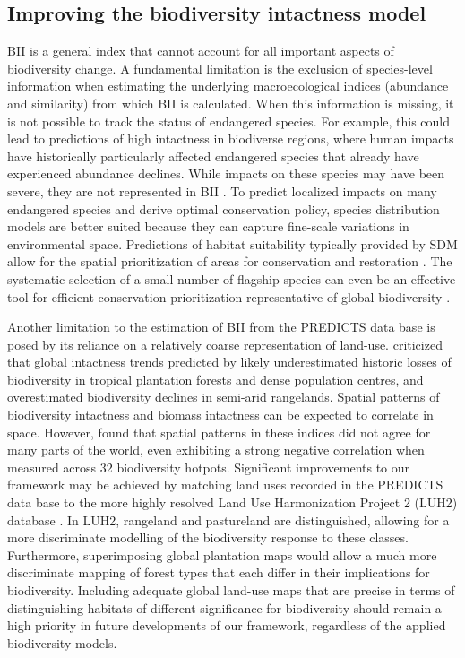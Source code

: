 \documentclass[titlesmallcaps,copyrightpage]{uomthesis}\usepackage[]{graphicx}\usepackage[]{color}
\begin{document}
\subsection{Improving the biodiversity intactness model}
BII is a general index that cannot account for all important aspects of biodiversity change. A fundamental limitation is the exclusion of species-level information when estimating the underlying macroecological indices (abundance and similarity) from which BII is calculated. When this information is missing, it is not possible to track the status of endangered species. For example, this could lead to predictions of high intactness in biodiverse regions, where human impacts have historically particularly affected endangered species that already have experienced abundance declines. While impacts on these species may have been severe, they are not represented in BII \citep{martin_biodiversity_2019}. To predict localized impacts on many endangered species and derive optimal conservation policy, species distribution models are better suited because they can capture fine-scale variations in environmental space. Predictions of habitat suitability typically provided by SDM allow for the spatial prioritization of areas for conservation and restoration \citep{wilson_applying_2011}. The systematic selection of a small number of flagship species can even be an effective tool for efficient conservation prioritization representative of global biodiversity \citep{mcgowan_conservation_2020}.

Another limitation to the estimation of BII from the PREDICTS data base is posed by its reliance on a relatively coarse representation of land-use. \citet{martin_biodiversity_2019} criticized that global intactness trends predicted by \citet{newbold_global_2016} likely underestimated historic losses of biodiversity in tropical plantation forests and dense population centres, and overestimated biodiversity declines in semi-arid rangelands. Spatial patterns of biodiversity intactness and biomass intactness \citep{erb_unexpectedly_2018} can be expected to correlate in space. However, \citet{martin_biodiversity_2019} found that spatial patterns in these indices did not agree for many parts of the world, even exhibiting a strong negative correlation when measured across 32 biodiversity hotpots. Significant improvements to our framework may be achieved by matching land uses recorded in the PREDICTS data base to the more highly resolved Land Use Harmonization Project 2 (LUH2) database \citep{hurtt_harmonization_2020}. In LUH2, rangeland and pastureland are distinguished, allowing for a more discriminate modelling of the biodiversity response to these classes. Furthermore, superimposing global plantation maps \citep{harris_spatial_2019} would allow a much more discriminate mapping of forest types that each differ in their implications for biodiversity. Including adequate global land-use maps that are precise in terms of distinguishing habitats of different significance for biodiversity should remain a high priority in future developments of our framework, regardless of the applied biodiversity models.
\end{document}
